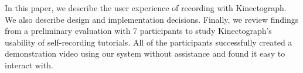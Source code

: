 In this paper, we describe the user experience of recording with Kinectograph. We also describe design and implementation decisions. Finally, we review findings from a preliminary evaluation with 7 participants to study Kinectograph's usability of self-recording tutorials. All of the participants successfully created a demonstration video using our system without assistance and found it easy to interact with.


